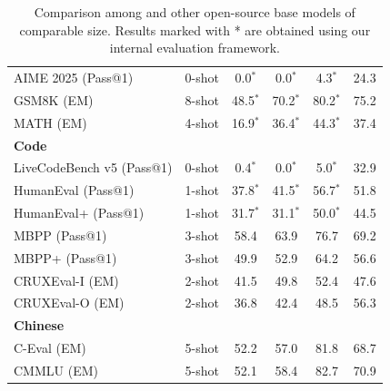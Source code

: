 \begin{table}[htbp]
{\begin{tabular}{l c | c c c | c}
    AIME 2025 {\tiny (Pass@1)} & 0-shot & 0.0$^*$ & 0.0$^*$ & 4.3$^*$ & 24.3  \\
    GSM8K {\tiny (EM)} & 8-shot & 48.5$^*$ & 70.2$^*$ & 80.2$^*$ & 75.2 \\
    MATH {\tiny (EM)} & 4-shot & 16.9$^*$ & 36.4$^*$ & 44.3$^*$ & 37.4 \\
    \midrule
    \multicolumn{6}{l}{\textbf{Code}} \\
    LiveCodeBench v5 {\tiny (Pass@1)} & 0-shot & 0.4$^*$ & 0.0$^*$ & 5.0$^*$ & 32.9 \\
    HumanEval {\tiny (Pass@1)} & 1-shot & 37.8$^*$ & 41.5$^*$ & 56.7$^*$ & 51.8 \\
    HumanEval+ {\tiny (Pass@1)} & 1-shot & 31.7$^*$ & 31.1$^*$ & 50.0$^*$ & 44.5 \\
    MBPP {\tiny (Pass@1)} & 3-shot & 58.4 & 63.9 & 76.7 & 69.2 \\
    MBPP+ {\tiny (Pass@1)} & 3-shot & 49.9 & 52.9 & 64.2 & 56.6 \\
    CRUXEval-I {\tiny (EM)} & 2-shot & 41.5 & 49.8 & 52.4 & 47.6 \\
    CRUXEval-O {\tiny (EM)} & 2-shot & 36.8 & 42.4 & 48.5 & 56.3 \\
    \midrule
    \multicolumn{6}{l}{\textbf{Chinese}} \\
    C-Eval {\tiny (EM)} & 5-shot & 52.2 & 57.0 & 81.8 & 68.7 \\
    CMMLU {\tiny (EM)} & 5-shot & 52.1 & 58.4 & 82.7 & 70.9 \\
    \bottomrule
    \end{tabular}
    }
    \caption{
        Comparison among \mimobase{} and other open-source base models of comparable size.
        Results marked with * are obtained using our internal evaluation framework.
    }
    \label{tab:base_eval}
\end{table}







